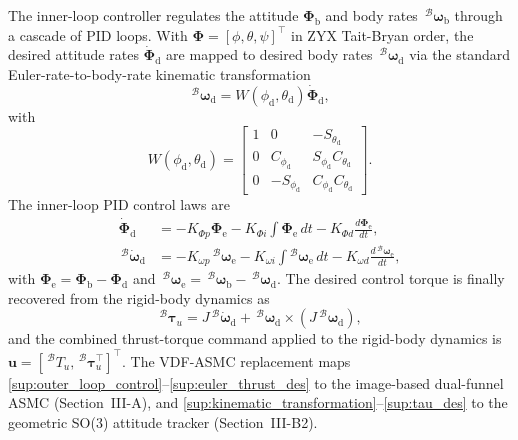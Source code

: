 \documentclass[10pt,journal]{IEEEtran}
\begin{document}
The inner-loop controller regulates the attitude $\boldsymbol{\Phi}_\text{b}$ and body rates $\,^\mathcal{B}\boldsymbol{\omega}_\text{b}$ through a cascade of PID loops. With $\boldsymbol{\Phi}=[\phi,\theta,\psi]^\top$ in ZYX Tait-Bryan order, the desired attitude rates $\dot{\boldsymbol{\Phi}}_\text{d}$ are mapped to desired body rates $\,^\mathcal{B}\boldsymbol{\omega}_\text{d}$ via the standard Euler-rate-to-body-rate kinematic transformation
\begin{equation} \label{sup:kinematic_transformation}
    \,^\mathcal{B}\boldsymbol{\omega}_\text{d} = W(\phi_\text{d},\theta_\text{d})\dot{\boldsymbol{\Phi}}_\text{d},
\end{equation}
with
\begin{equation*}
    W(\phi_\text{d},\theta_\text{d}) = \begin{bmatrix} 1 & 0 & -S_{\theta_\text{d}} \\ 0 & C_{\phi_\text{d}} & S_{\phi_\text{d}}C_{\theta_\text{d}} \\ 0 & -S_{\phi_\text{d}} & C_{\phi_\text{d}}C_{\theta_\text{d}} \end{bmatrix}.
\end{equation*}
The inner-loop PID control laws are
\begin{align}
    \dot{\boldsymbol{\Phi}}_\text{d} &= - K_{\Phi p}\boldsymbol{\Phi}_\text{e} - K_{\Phi i}\!\int\!\boldsymbol{\Phi}_\text{e}\,dt - K_{\Phi d}\frac{d\boldsymbol{\Phi}_\text{e}}{dt}, \nonumber \\
    \,^\mathcal{B}\dot{\boldsymbol{\omega}}_\text{d} &= - K_{\omega p}\,^\mathcal{B}\boldsymbol{\omega}_\text{e} - K_{\omega i}\!\int\!^\mathcal{B}\boldsymbol{\omega}_\text{e}\,dt - K_{\omega d}\frac{d\,^\mathcal{B}\boldsymbol{\omega}_\text{e}}{dt},
\end{align}
with $\boldsymbol{\Phi}_\text{e}=\boldsymbol{\Phi}_\text{b}-\boldsymbol{\Phi}_\text{d}$ and $\,^\mathcal{B}\boldsymbol{\omega}_\text{e}=\,^\mathcal{B}\boldsymbol{\omega}_\text{b}-\,^\mathcal{B}\boldsymbol{\omega}_\text{d}$. The desired control torque is finally recovered from the rigid-body dynamics as
\begin{equation} \label{sup:tau_des}
    \,^\mathcal{B}\boldsymbol{\tau}_u = J\,^\mathcal{B}\dot{\boldsymbol{\omega}}_\text{d} + \,^\mathcal{B}\boldsymbol{\omega}_\text{d}\times(J\,^\mathcal{B}\boldsymbol{\omega}_\text{d}),
\end{equation}
and the combined thrust-torque command applied to the rigid-body dynamics is $\boldsymbol{u}=[\,^\mathcal{B}T_u,\,^\mathcal{B}\boldsymbol{\tau}_u^\top]^\top$. The VDF-ASMC replacement maps \eqref{sup:outer_loop_control}--\eqref{sup:euler_thrust_des} to the image-based dual-funnel ASMC (Section~III-A), and \eqref{sup:kinematic_transformation}--\eqref{sup:tau_des} to the geometric SO(3) attitude tracker (Section~III-B2).
\end{document}
